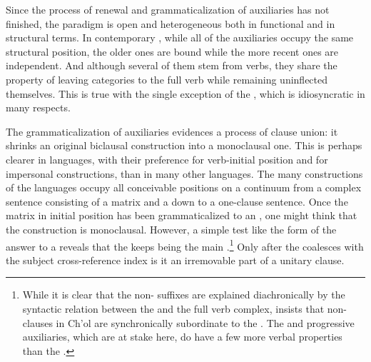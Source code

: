 \documentclass[output=paper]{langsci/langscibook}
\begin{document}
Since the process of renewal and grammaticalization of auxiliaries has not finished, the paradigm is open and heterogeneous both in functional and in structural terms. In contemporary , while all of the auxiliaries occupy the same structural position, the older ones are bound while the more recent ones are independent. And although several of them stem from verbs, they share the property of leaving  categories to the full verb while remaining uninflected themselves. This is true with the single exception of the  , which is idiosyncratic in many respects.

The grammaticalization of auxiliaries evidences a process of clause union: it shrinks an original biclausal construction into a monoclausal one. This is perhaps clearer in  languages, with their preference for verb-initial position and for impersonal constructions, than in many other languages. The many  constructions of the  languages occupy all conceivable positions on a continuum from a complex sentence consisting of a matrix and a  down to a one-clause sentence. Once the matrix  in initial position has been grammaticalized to an , one might think that the construction is monoclausal. However, a simple test like the form of the answer to a  reveals that the  keeps being the main .\footnote{While it is clear that the non- suffixes are explained diachronically by the syntactic relation between the  and the full verb complex, \citet[§2.3.3]{Coon2010} insists that non- clauses in Ch'ol are synchronically subordinate to the . The  and progressive auxiliaries, which are at stake here, do have a few more verbal properties than the   .} Only after the  coalesces with the subject cross-reference index is it an irremovable part of a unitary clause.
\end{document}
